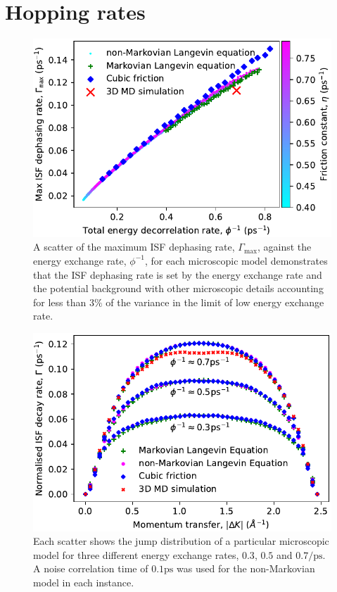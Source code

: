\documentclass[7pt]{article}
\newcommand{\ps}{\si{\pico\second}}
\newcommand{\ips}{\si{\per\pico\second}}
\begin{document}
\section*{Hopping rates}

\begin{figure}
	\centering
	\includegraphics[width=1.0\columnwidth]{gamma_ttf}
	\caption{A scatter of the maximum ISF dephasing rate, $\Gamma_{\text{max}}$, against the energy exchange rate, $\phi^{-1}$, for each microscopic model demonstrates that the ISF dephasing rate is set by the energy exchange rate and the potential background with other microscopic details accounting for less than $3\%$ of the variance in the limit of low energy exchange rate.}
	\label{fig:gamma_ttf}
\end{figure}

\begin{figure}
	\centering
	\includegraphics[width=1.0\columnwidth]{jump_distribution}
	\caption{Each scatter shows the jump distribution of a particular microscopic model for three different energy exchange rates, $0.3$, $0.5$ and $0.7\ips$. A noise correlation time of $0.1\ps$ was used for the non-Markovian model in each instance.} 
	\label{fig:jump_distribution}
\end{figure}
\end{document}
